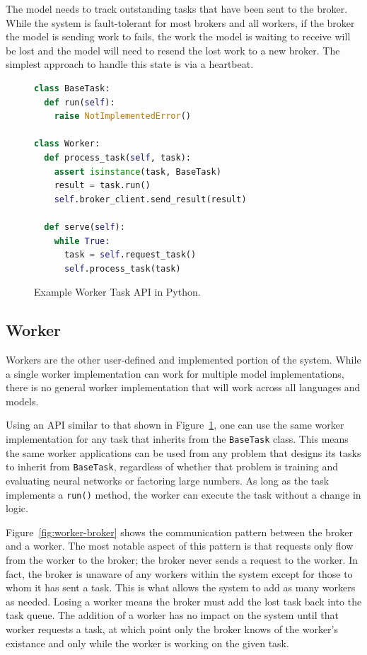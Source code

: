 \documentclass[conference]{IEEEtran}
\begin{document}
The model needs to track outstanding tasks that have been sent to the broker.
While the system is fault-tolerant for most brokers and all workers, if the
broker the model is sending work to fails, the work the model is waiting to
receive will be lost and the model will need to resend the lost work
to a new broker. The simplest approach to handle this state is via a heartbeat.

\begin{figure}
  \begin{lstlisting}[language=python]
class BaseTask:
  def run(self):
    raise NotImplementedError()

class Worker:
  def process_task(self, task):
    assert isinstance(task, BaseTask)
    result = task.run()
    self.broker_client.send_result(result)

  def serve(self):
    while True:
      task = self.request_task()
      self.process_task(task)
  \end{lstlisting}
  \caption{Example Worker Task API in Python.}\label{fig:python-api}
\end{figure}


\subsection{Worker}
Workers are the other user-defined and implemented portion of the system. While
a single worker implementation can work for multiple model implementations,
there is no general worker implementation that will work across all languages
and models.


Using an API similar to that shown in Figure~\ref{fig:python-api}, one can use
the same worker implementation for any task that inherits from the
\texttt{BaseTask} class. This means the same worker applications can be used
from any problem that designs its tasks to inherit from \texttt{BaseTask},
regardless of whether that problem is training and evaluating neural networks
or factoring large numbers. As long as the task implements a \texttt{run()} method,
the worker can execute the task without a change in logic.

Figure~\ref{fig:worker-broker} shows the communication pattern between the
broker and a worker. The most notable aspect of this pattern is that requests only
flow from the worker to the broker; the broker never sends a request to the
worker. In fact, the broker is unaware of any workers within the system except
for those to whom it has sent a task. This is what allows the system to add
as many workers as needed. Losing a worker means the broker must add the lost
task back into the task queue. The addition of a worker has no impact on the
system until that worker requests a task, at which point only the broker
knows of the worker's existance and only while the worker is working on the
given task.
\end{document}
